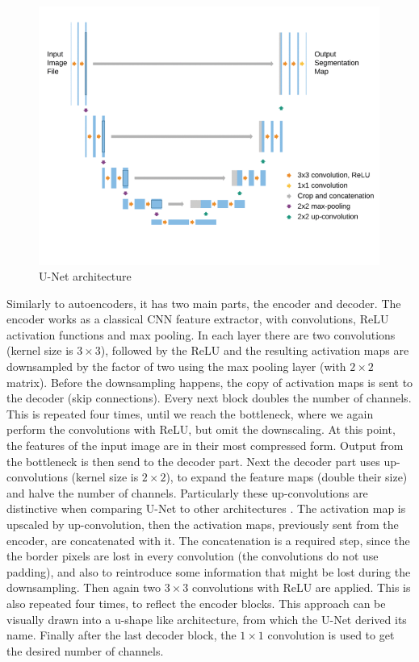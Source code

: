 \begin{figure}[H]
\begin{centering}
\includegraphics[width=12cm]{assets/images/unet.png}
\par\end{centering}
\caption{U-Net architecture \cite{Siddique2021}}
\label{fig:unet}
\end{figure}

Similarly to autoencoders, it has two main parts, the encoder and decoder. The encoder works as a classical CNN feature extractor, with convolutions, ReLU activation functions and max pooling. In each layer there are two convolutions (kernel size is $3\!\times\!3$), followed by the ReLU and the resulting activation maps are downsampled by the factor of two using the max pooling layer (with $2\!\times\!2$ matrix). Before the downsampling happens, the copy of activation maps is sent to the decoder (skip connections). Every next block doubles the number of channels. This is repeated four times, until we reach the bottleneck, where we again perform the convolutions with ReLU, but omit the downscaling. At this point, the features of the input image are in their most compressed form. Output from the bottleneck is then send to the decoder part. Next the decoder part uses up-convolutions (kernel size is $2\!\times\!2$), to expand the feature maps (double their size) and halve the number of channels. Particularly these up-convolutions are distinctive when comparing U-Net to other architectures \cite{Siddique2021}. The activation map is upscaled by up-convolution, then the activation maps, previously sent from the encoder, are concatenated with it. The concatenation is a required step, since the the border pixels are lost in every convolution (the convolutions do not use padding), and also to reintroduce some information that might be lost during the downsampling. Then again two $3\!\times\!3$ convolutions with ReLU are applied. This is also repeated four times, to reflect the encoder blocks. This approach can be visually drawn into a u-shape like architecture, from which the U-Net derived its name. Finally after the last decoder block, the $1\!\times\!1$ convolution is used to get the desired number of channels.

